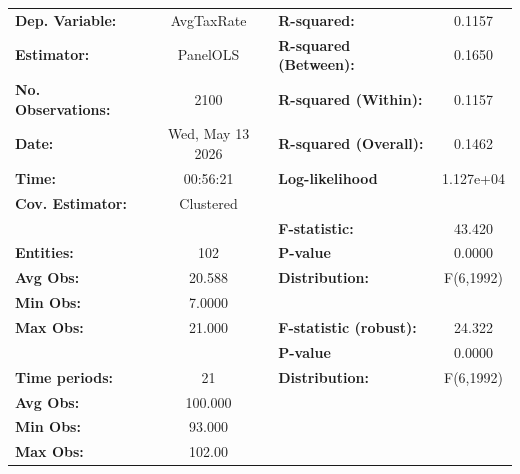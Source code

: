 \begin{center}
\begin{tabular}{lclc}
\toprule
\textbf{Dep. Variable:}                       &     AvgTaxRate     & \textbf{  R-squared:         }   &      0.1157      \\
\textbf{Estimator:}                           &      PanelOLS      & \textbf{  R-squared (Between):}  &      0.1650      \\
\textbf{No. Observations:}                    &        2100        & \textbf{  R-squared (Within):}   &      0.1157      \\
\textbf{Date:}                                &  Wed, May 13 2026  & \textbf{  R-squared (Overall):}  &      0.1462      \\
\textbf{Time:}                                &      00:56:21      & \textbf{  Log-likelihood     }   &    1.127e+04     \\
\textbf{Cov. Estimator:}                      &     Clustered      & \textbf{                     }   &                  \\
\textbf{}                                     &                    & \textbf{  F-statistic:       }   &      43.420      \\
\textbf{Entities:}                            &        102         & \textbf{  P-value            }   &      0.0000      \\
\textbf{Avg Obs:}                             &       20.588       & \textbf{  Distribution:      }   &    F(6,1992)     \\
\textbf{Min Obs:}                             &       7.0000       & \textbf{                     }   &                  \\
\textbf{Max Obs:}                             &       21.000       & \textbf{  F-statistic (robust):} &      24.322      \\
\textbf{}                                     &                    & \textbf{  P-value            }   &      0.0000      \\
\textbf{Time periods:}                        &         21         & \textbf{  Distribution:      }   &    F(6,1992)     \\
\textbf{Avg Obs:}                             &      100.000       & \textbf{                     }   &                  \\
\textbf{Min Obs:}                             &       93.000       & \textbf{                     }   &                  \\
\textbf{Max Obs:}                             &       102.00       & \textbf{                     }   &                  \\

\end{tabular}
\end{center}
